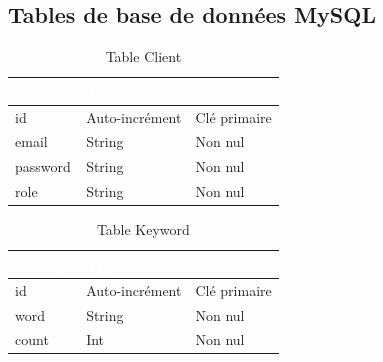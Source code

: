 \subsection{Tables de base de données MySQL}
\begin{table}[H]
	\centering
	\Large
	\begin{tabular}{|p{4cm}|p{4cm}|p{4cm}|}
		\hline
		\rowcolor{blue!50} \textcolor{white}{Champs} & \textcolor{white}{Type} & \textcolor{white}{Contrainte} \\
		\hline
		id                                           & Auto-incrément          & Clé primaire                  \\ \hline
		email                                        & String                  & Non nul                       \\ \hline
		password                                     & String                  & Non nul                       \\ \hline
		role                                         & String                  & Non nul                       \\ \hline
	\end{tabular}
	\caption{Table Client}
	\label{tab:table_client}
\end{table}

\begin{table}[H]
	\centering
	\Large
	\begin{tabular}{|p{4cm}|p{4cm}|p{4cm}|}
		\hline
		\rowcolor{blue!50} \textcolor{white}{Champs} & \textcolor{white}{Type} & \textcolor{white}{Contrainte} \\
		\hline
		id                                           & Auto-incrément          & Clé primaire                  \\ \hline
		word                                         & String                  & Non nul                       \\ \hline
		count                                        & Int                     & Non nul                       \\ \hline
	\end{tabular}
	\caption{Table Keyword}
	\label{tab:table_keyword}
\end{table}

